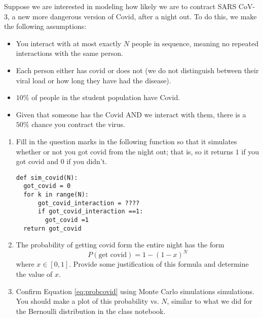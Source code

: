 \begin{exercise}
Suppose we are interested in modeling how likely we are to contract SARS CoV-3, a new more dangerous version of Covid, after a night out. To do this, we make the following assumptions:
\begin{itemize}
\item You interact with at most exactly $N$ people in sequence, meaning no repeated interactions with the same person.  
\item Each person either has covid or does not (we do not distinguish between their viral load or how long they have had the disease). \item $10\%$ of people in the student population have Covid. 
\item Given that someone has the Covid AND we interact with them, there is a $50\%$ chance you contract the virus. 
\end{itemize}




\begin{enumerate}[label=(\alph*)]
\item Fill in the question marks in the following function so that it simulates whether or not you got covid from the night out; that is, so it returns $1$ if you got covid and $0$ if you didn't.
\begin{Verbatim}
def sim_covid(N):
  got_covid = 0
  for k in range(N):
      got_covid_interaction = ????
      if got_covid_interaction ==1:
        got_covid =1
  return got_covid
\end{Verbatim}
\item  The probability of getting covid form the entire night has the form 
\begin{equation}\label{eq:probcovid}
P(\text{get covid}) = 1-\left(1-x\right)^N
\end{equation}
where $x \in [0,1]$. Provide some justification of this formula and determine the value of $x$. 
\item Confirm Equation \ref{eq:probcovid} using Monte Carlo simulations simulations. You should make a plot of this probability vs. $N$, similar to what we did for the Bernoulli distribution in the class notebook.
\end{enumerate}
\end{exercise}

